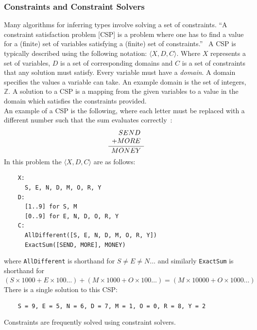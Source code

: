 \documentclass[12pt, titlepage]{article}
\begin{document}
\subsubsection{Constraints and Constraint Solvers}
Many algorithms for inferring types involve solving a set of constraints. ``A constraint satisfaction problem [CSP] is a problem where one has to find a value for a (finite) set of variables satisfying a (finite) set of constraints.''~\cite{constraintBook} A CSP is typically described using the following notation: $\langle X, D, C \rangle$. Where $X$ represents a set of variables, $D$ is a set of corresponding domains and $C$ is a set of constraints that any solution must satisfy. Every variable must have a \textit{domain}. A domain specifies the values a variable can take. An example domain is the set of integers, $\mathbb{Z}$. A solution to a CSP is a mapping from the given variables to a value in the domain which satisfies the constraints provided. \\
\indent An example of a CSP is the following, where each letter must be replaced with a different number such that the sum evaluates correctly~\cite{constraintPrinciples}: \\
\begin{equation*}
\frac{
    \begin{array}[b]{r}
      SEND \\
      + MORE
    \end{array}
  }{
    MONEY
  }
\end{equation*}
In this problem the  $\langle X, D, C \rangle$ are as follows:
\begin{verbatim}
    X:
      S, E, N, D, M, O, R, Y 
    D:
      [1..9] for S, M
      [0..9] for E, N, D, O, R, Y
    C:
      AllDifferent([S, E, N, D, M, O, R, Y])
      ExactSum([SEND, MORE], MONEY)
\end{verbatim}
where \texttt{AllDifferent} is shorthand for $S \neq E \neq N \ldots$ and similarly \texttt{ExactSum} is shorthand for $(S \times 1000 + E \times 100 \ldots)  + (M \times 1000 + O \times 100 \ldots) = (M \times 10000 + O \times 1000 \ldots) $ \\
\indent There is a single solution to this CSP:
\begin{verbatim}
    S = 9, E = 5, N = 6, D = 7, M = 1, O = 0, R = 8, Y = 2
\end{verbatim}
Constraints are frequently solved using constraint solvers. %
\end{document}
